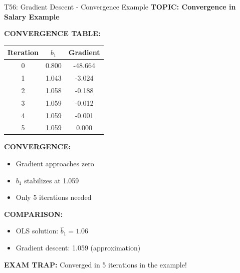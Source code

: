 \documentclass[8pt]{beamer}
\begin{document}
	\begin{frame}{T56: Gradient Descent - Convergence Example}
		\fontsize{6.5}{7.5}\selectfont
		\textbf{TOPIC: Convergence in Salary Example}
		
		\vspace{0.1cm}
		\textbf{CONVERGENCE TABLE:}
		\begin{tabular}{|c|c|c|}
			\hline
			Iteration & $b_1$ & Gradient \\
			\hline
			0 & 0.800 & -48.664 \\
			1 & 1.043 & -3.024 \\
			2 & 1.058 & -0.188 \\
			3 & 1.059 & -0.012 \\
			4 & 1.059 & -0.001 \\
			5 & 1.059 & 0.000 \\
			\hline
		\end{tabular}
		
		\vspace{0.1cm}
		\textbf{CONVERGENCE:}
		\begin{itemize}
			\item Gradient approaches zero
			\item $b_1$ stabilizes at 1.059
			\item Only 5 iterations needed
		\end{itemize}
		
		\vspace{0.1cm}
		\textbf{COMPARISON:}
		\begin{itemize}
			\item OLS solution: $\hat{b}_1 = 1.06$
			\item Gradient descent: 1.059 (approximation)
		\end{itemize}
		
		\textcolor{myred}{\textbf{EXAM TRAP:}} Converged in \textcolor{myblue}{5 iterations} in the example!
	\end{frame}
	
\end{document}
